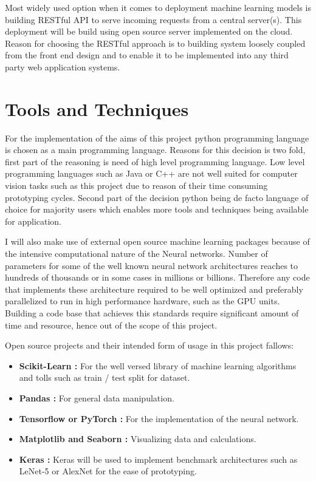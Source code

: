 \documentclass[12pt, twoside, a4paper]{article}
\begin{document}
Most widely used option when it comes to deployment machine learning models is building RESTful API to serve incoming requests from a central server(s).  This deployment will be build using open source server implemented on the cloud. Reason for choosing the RESTful approach is to building system loosely coupled from the front end design and to enable it to be implemented into any third party web application systems.
\clearpage

\section{Tools and Techniques}
For the implementation of the aims of this project python programming language is chosen as a main programming language. Reasons for this decision is two fold, first part of the reasoning is need of high level programming language. Low level programming languages such as Java or C++ are not well suited for computer vision tasks such as this project due to reason of their time consuming prototyping cycles. Second part of the decision python being de facto language of choice for majority users which enables more tools and techniques being available for application. 

I will also make use of external open source machine learning packages because of the intensive computational nature of the Neural networks. Number of parameters for some of the well known neural network architectures reaches to hundreds of thousands or in some cases in millions or billions. Therefore any code that implements these architecture required to be well optimized and preferably parallelized to run in high performance hardware, such as the GPU units. Building a code base that achieves this standards require significant amount of time and resource, hence out of the scope of this project. 

Open source projects and their intended form of usage in this project fallows:

\begin{itemize}
    \item \textbf{Scikit-Learn \cite{scikit-learn}: }For the well versed library of machine learning algorithms and tolls such as train / test split for dataset.
    \item \textbf{Pandas \cite{pandas}: }For general data manipulation.
    \item \textbf{Tensorflow \cite{tensorflow} or PyTorch \cite{pytorch}: }For the implementation of the neural network.
    \item \textbf{Matplotlib \cite{matplotlib} and Seaborn \cite{seaborn}: }Visualizing data and calculations.
    \item \textbf{Keras \cite{keras}: }Keras will be used to implement benchmark architectures such as LeNet-5 or AlexNet for the ease of prototyping.
\end{itemize}
\clearpage
\end{document}
